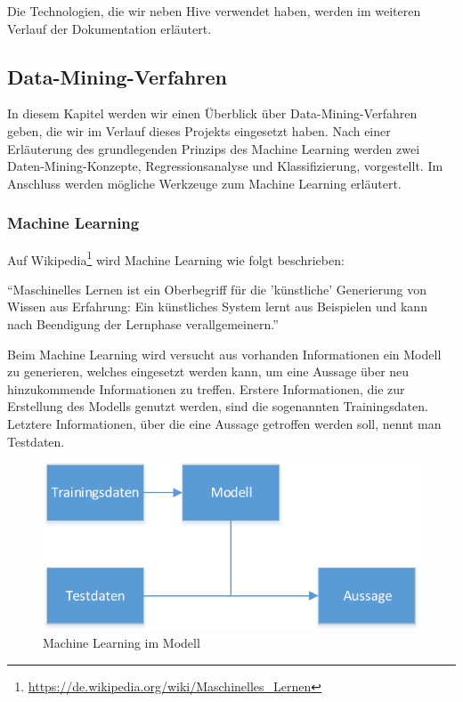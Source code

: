 Die Technologien, die wir neben Hive verwendet haben, werden im weiteren Verlauf der Dokumentation erläutert.


\subsection{Data-Mining-Verfahren}
In diesem Kapitel werden wir einen Überblick über Data-Mining-Verfahren geben, die wir im Verlauf dieses Projekts eingesetzt haben. Nach einer Erläuterung des grundlegenden Prinzips des Machine Learning werden zwei Daten-Mining-Konzepte, Regressionsanalyse und Klassifizierung, vorgestellt. Im Anschluss werden mögliche Werkzeuge zum Machine Learning erläutert.

\subsubsection{Machine Learning}
Auf Wikipedia\footnote{\url{https://de.wikipedia.org/wiki/Maschinelles_Lernen}} wird Machine Learning wie folgt beschrieben: 

\begin{center}
“Maschinelles Lernen ist ein Oberbegriff für die 'künstliche' Generierung von Wissen aus Erfahrung: Ein künstliches System lernt aus Beispielen und kann nach Beendigung der Lernphase verallgemeinern.”
\end{center}

Beim Machine Learning wird versucht aus vorhanden Informationen ein Modell zu generieren, welches eingesetzt werden kann, um eine Aussage über neu hinzukommende Informationen zu treffen. Erstere Informationen, die zur Erstellung des Modells genutzt werden, sind die sogenannten Trainingsdaten. Letztere Informationen, über die eine Aussage getroffen werden soll, nennt man Testdaten.

\begin{figure}[H]
\centering
\includegraphics[width=0.7\linewidth]{Bilder/DataMining}
\caption{Machine Learning im Modell}
\label{fig:MachineLearning}
\end{figure}

